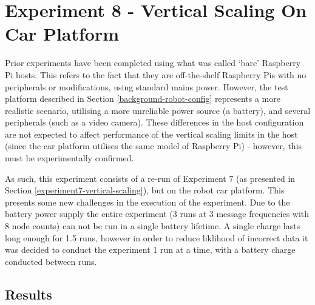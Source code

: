 \documentclass[../dissertation.tex]{subfiles}
\begin{document}
\section{Experiment 8 - Vertical Scaling On Car Platform}
\label{experiment8-vertical-scaling}

Prior experiments have been completed using what was called `bare' Raspberry Pi hosts. This refers to the fact that they are off-the-shelf Raspberry Pis with no peripherals or modifications, using standard mains power. However, the test platform described in Section \ref{background-robot-config} represents a more realistic scenario, utilising a more unreliable power source (a battery), and several peripherals (such as a video camera). These differences in the host configuration are not expected to affect performance of the vertical scaling limits in the host (since the car platform utilises the same model of Raspberry Pi) - however, this must be experimentally confirmed.

As such, this experiment consists of a re-run of Experiment 7 (as presented in Section \ref{experiment7-vertical-scaling}), but on the robot car platform. This presents some new challenges in the execution of the experiment. Due to the battery power supply the entire experiment (3 runs at 3 message frequencies with 8 node counts) can not be run in a single battery lifetime. A single charge lasts long enough for 1.5 runs, however in order to reduce liklihood of incorrect data it was decided to conduct the experiment 1 run at a time, with a battery charge conducted between runs.

\subsection{Results}
\end{document}

